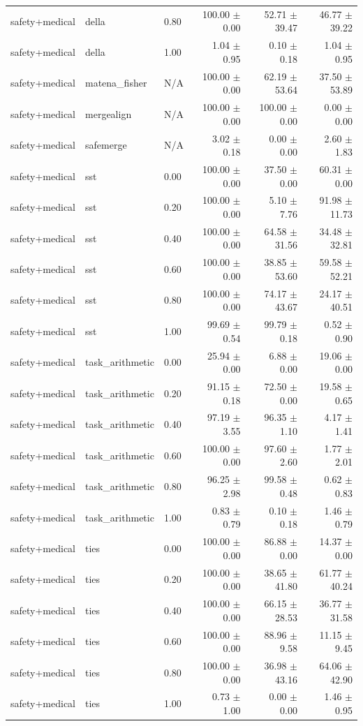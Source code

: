 \begin{table}[H]
{\begin{tabular}{lllrrr}
safety+medical & della & 0.80 & 100.00 $\pm$ 0.00 & 52.71 $\pm$ 39.47 & 46.77 $\pm$ 39.22 \\
safety+medical & della & 1.00 & 1.04 $\pm$ 0.95 & 0.10 $\pm$ 0.18 & 1.04 $\pm$ 0.95 \\
safety+medical & matena\_fisher & N/A & 100.00 $\pm$ 0.00 & 62.19 $\pm$ 53.64 & 37.50 $\pm$ 53.89 \\
safety+medical & mergealign & N/A & 100.00 $\pm$ 0.00 & 100.00 $\pm$ 0.00 & 0.00 $\pm$ 0.00 \\
safety+medical & safemerge & N/A & 3.02 $\pm$ 0.18 & 0.00 $\pm$ 0.00 & 2.60 $\pm$ 1.83 \\
safety+medical & sst & 0.00 & 100.00 $\pm$ 0.00 & 37.50 $\pm$ 0.00 & 60.31 $\pm$ 0.00 \\
safety+medical & sst & 0.20 & 100.00 $\pm$ 0.00 & 5.10 $\pm$ 7.76 & 91.98 $\pm$ 11.73 \\
safety+medical & sst & 0.40 & 100.00 $\pm$ 0.00 & 64.58 $\pm$ 31.56 & 34.48 $\pm$ 32.81 \\
safety+medical & sst & 0.60 & 100.00 $\pm$ 0.00 & 38.85 $\pm$ 53.60 & 59.58 $\pm$ 52.21 \\
safety+medical & sst & 0.80 & 100.00 $\pm$ 0.00 & 74.17 $\pm$ 43.67 & 24.17 $\pm$ 40.51 \\
safety+medical & sst & 1.00 & 99.69 $\pm$ 0.54 & 99.79 $\pm$ 0.18 & 0.52 $\pm$ 0.90 \\
safety+medical & task\_arithmetic & 0.00 & 25.94 $\pm$ 0.00 & 6.88 $\pm$ 0.00 & 19.06 $\pm$ 0.00 \\
safety+medical & task\_arithmetic & 0.20 & 91.15 $\pm$ 0.18 & 72.50 $\pm$ 0.00 & 19.58 $\pm$ 0.65 \\
safety+medical & task\_arithmetic & 0.40 & 97.19 $\pm$ 3.55 & 96.35 $\pm$ 1.10 & 4.17 $\pm$ 1.41 \\
safety+medical & task\_arithmetic & 0.60 & 100.00 $\pm$ 0.00 & 97.60 $\pm$ 2.60 & 1.77 $\pm$ 2.01 \\
safety+medical & task\_arithmetic & 0.80 & 96.25 $\pm$ 2.98 & 99.58 $\pm$ 0.48 & 0.62 $\pm$ 0.83 \\
safety+medical & task\_arithmetic & 1.00 & 0.83 $\pm$ 0.79 & 0.10 $\pm$ 0.18 & 1.46 $\pm$ 0.79 \\
safety+medical & ties & 0.00 & 100.00 $\pm$ 0.00 & 86.88 $\pm$ 0.00 & 14.37 $\pm$ 0.00 \\
safety+medical & ties & 0.20 & 100.00 $\pm$ 0.00 & 38.65 $\pm$ 41.80 & 61.77 $\pm$ 40.24 \\
safety+medical & ties & 0.40 & 100.00 $\pm$ 0.00 & 66.15 $\pm$ 28.53 & 36.77 $\pm$ 31.58 \\
safety+medical & ties & 0.60 & 100.00 $\pm$ 0.00 & 88.96 $\pm$ 9.58 & 11.15 $\pm$ 9.45 \\
safety+medical & ties & 0.80 & 100.00 $\pm$ 0.00 & 36.98 $\pm$ 43.16 & 64.06 $\pm$ 42.90 \\
safety+medical & ties & 1.00 & 0.73 $\pm$ 1.00 & 0.00 $\pm$ 0.00 & 1.46 $\pm$ 0.95 \\
\bottomrule
\end{tabular}
}
\end{table}